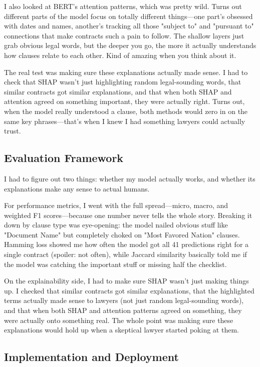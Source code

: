 I also looked at BERT's attention patterns, which was pretty wild. Turns out different parts of the model focus on totally different things—one part's obsessed with dates and names, another's tracking all those "subject to" and "pursuant to" connections that make contracts such a pain to follow. The shallow layers just grab obvious legal words, but the deeper you go, the more it actually understands how clauses relate to each other. Kind of amazing when you think about it.

The real test was making sure these explanations actually made sense. I had to check that SHAP wasn't just highlighting random legal-sounding words, that similar contracts got similar explanations, and that when both SHAP and attention agreed on something important, they were actually right. Turns out, when the model really understood a clause, both methods would zero in on the same key phrases—that's when I knew I had something lawyers could actually trust.
\subsection{Evaluation Framework}

I had to figure out two things: whether my model actually works, and whether its explanations make any sense to actual humans.

For performance metrics, I went with the full spread—micro, macro, and weighted F1 scores—because one number never tells the whole story. Breaking it down by clause type was eye-opening: the model nailed obvious stuff like "Document Name" but completely choked on "Most Favored Nation" clauses. Hamming loss showed me how often the model got all 41 predictions right for a single contract (spoiler: not often), while Jaccard similarity basically told me if the model was catching the important stuff or missing half the checklist.

On the explainability side, I had to make sure SHAP wasn't just making things up. I checked that similar contracts got similar explanations, that the highlighted terms actually made sense to lawyers (not just random legal-sounding words), and that when both SHAP and attention patterns agreed on something, they were actually onto something real. The whole point was making sure these explanations would hold up when a skeptical lawyer started poking at them.
\subsection{Implementation and Deployment}

